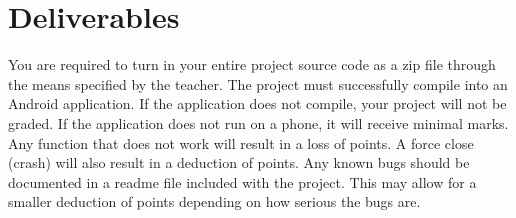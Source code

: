 \section{Deliverables}

You are required to turn in your entire project source code as a zip file through the means specified by the teacher. The project must successfully compile into an Android application. If the application does not compile, your project will not be graded. If the application does not run on a phone, it will receive minimal marks. Any function that does not work will result in a loss of points. A force close (crash) will also result in a deduction of points. Any known bugs should be documented in a readme file included with the project. This may allow for a smaller deduction of points depending on how serious the bugs are.